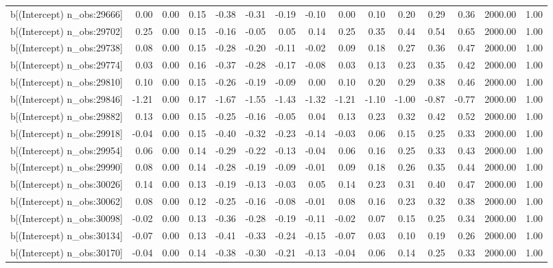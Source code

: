 \begin{table}[ht]
\begin{tabular}{rrrrrrrrrrrrrrr}
  b[(Intercept) n\_obs:29666] & 0.00 & 0.00 & 0.15 & -0.38 & -0.31 & -0.19 & -0.10 & 0.00 & 0.10 & 0.20 & 0.29 & 0.36 & 2000.00 & 1.00 \\ 
  b[(Intercept) n\_obs:29702] & 0.25 & 0.00 & 0.15 & -0.16 & -0.05 & 0.05 & 0.14 & 0.25 & 0.35 & 0.44 & 0.54 & 0.65 & 2000.00 & 1.00 \\ 
  b[(Intercept) n\_obs:29738] & 0.08 & 0.00 & 0.15 & -0.28 & -0.20 & -0.11 & -0.02 & 0.09 & 0.18 & 0.27 & 0.36 & 0.47 & 2000.00 & 1.00 \\ 
  b[(Intercept) n\_obs:29774] & 0.03 & 0.00 & 0.16 & -0.37 & -0.28 & -0.17 & -0.08 & 0.03 & 0.13 & 0.23 & 0.35 & 0.42 & 2000.00 & 1.00 \\ 
  b[(Intercept) n\_obs:29810] & 0.10 & 0.00 & 0.15 & -0.26 & -0.19 & -0.09 & 0.00 & 0.10 & 0.20 & 0.29 & 0.38 & 0.46 & 2000.00 & 1.00 \\ 
  b[(Intercept) n\_obs:29846] & -1.21 & 0.00 & 0.17 & -1.67 & -1.55 & -1.43 & -1.32 & -1.21 & -1.10 & -1.00 & -0.87 & -0.77 & 2000.00 & 1.00 \\ 
  b[(Intercept) n\_obs:29882] & 0.13 & 0.00 & 0.15 & -0.25 & -0.16 & -0.05 & 0.04 & 0.13 & 0.23 & 0.32 & 0.42 & 0.52 & 2000.00 & 1.00 \\ 
  b[(Intercept) n\_obs:29918] & -0.04 & 0.00 & 0.15 & -0.40 & -0.32 & -0.23 & -0.14 & -0.03 & 0.06 & 0.15 & 0.25 & 0.33 & 2000.00 & 1.00 \\ 
  b[(Intercept) n\_obs:29954] & 0.06 & 0.00 & 0.14 & -0.29 & -0.22 & -0.13 & -0.04 & 0.06 & 0.16 & 0.25 & 0.33 & 0.43 & 2000.00 & 1.00 \\ 
  b[(Intercept) n\_obs:29990] & 0.08 & 0.00 & 0.14 & -0.28 & -0.19 & -0.09 & -0.01 & 0.09 & 0.18 & 0.26 & 0.35 & 0.44 & 2000.00 & 1.00 \\ 
  b[(Intercept) n\_obs:30026] & 0.14 & 0.00 & 0.13 & -0.19 & -0.13 & -0.03 & 0.05 & 0.14 & 0.23 & 0.31 & 0.40 & 0.47 & 2000.00 & 1.00 \\ 
  b[(Intercept) n\_obs:30062] & 0.08 & 0.00 & 0.12 & -0.25 & -0.16 & -0.08 & -0.01 & 0.08 & 0.16 & 0.23 & 0.32 & 0.38 & 2000.00 & 1.00 \\ 
  b[(Intercept) n\_obs:30098] & -0.02 & 0.00 & 0.13 & -0.36 & -0.28 & -0.19 & -0.11 & -0.02 & 0.07 & 0.15 & 0.25 & 0.34 & 2000.00 & 1.00 \\ 
  b[(Intercept) n\_obs:30134] & -0.07 & 0.00 & 0.13 & -0.41 & -0.33 & -0.24 & -0.15 & -0.07 & 0.03 & 0.10 & 0.19 & 0.26 & 2000.00 & 1.00 \\ 
  b[(Intercept) n\_obs:30170] & -0.04 & 0.00 & 0.14 & -0.38 & -0.30 & -0.21 & -0.13 & -0.04 & 0.06 & 0.14 & 0.25 & 0.33 & 2000.00 & 1.00 \\ 

\end{tabular}
\end{table}
